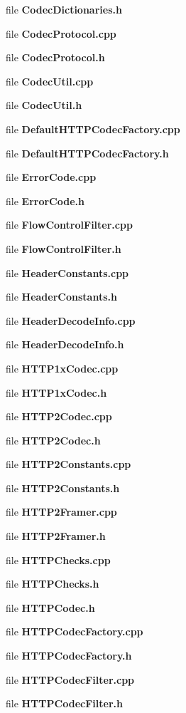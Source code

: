 \begin{DoxyCompactItemize}
\item 
file {\bf Codec\+Dictionaries.\+h}
\item 
file {\bf Codec\+Protocol.\+cpp}
\item 
file {\bf Codec\+Protocol.\+h}
\item 
file {\bf Codec\+Util.\+cpp}
\item 
file {\bf Codec\+Util.\+h}
\item 
file {\bf Default\+H\+T\+T\+P\+Codec\+Factory.\+cpp}
\item 
file {\bf Default\+H\+T\+T\+P\+Codec\+Factory.\+h}
\item 
file {\bf Error\+Code.\+cpp}
\item 
file {\bf Error\+Code.\+h}
\item 
file {\bf Flow\+Control\+Filter.\+cpp}
\item 
file {\bf Flow\+Control\+Filter.\+h}
\item 
file {\bf Header\+Constants.\+cpp}
\item 
file {\bf Header\+Constants.\+h}
\item 
file {\bf Header\+Decode\+Info.\+cpp}
\item 
file {\bf Header\+Decode\+Info.\+h}
\item 
file {\bf H\+T\+T\+P1x\+Codec.\+cpp}
\item 
file {\bf H\+T\+T\+P1x\+Codec.\+h}
\item 
file {\bf H\+T\+T\+P2\+Codec.\+cpp}
\item 
file {\bf H\+T\+T\+P2\+Codec.\+h}
\item 
file {\bf H\+T\+T\+P2\+Constants.\+cpp}
\item 
file {\bf H\+T\+T\+P2\+Constants.\+h}
\item 
file {\bf H\+T\+T\+P2\+Framer.\+cpp}
\item 
file {\bf H\+T\+T\+P2\+Framer.\+h}
\item 
file {\bf H\+T\+T\+P\+Checks.\+cpp}
\item 
file {\bf H\+T\+T\+P\+Checks.\+h}
\item 
file {\bf H\+T\+T\+P\+Codec.\+h}
\item 
file {\bf H\+T\+T\+P\+Codec\+Factory.\+cpp}
\item 
file {\bf H\+T\+T\+P\+Codec\+Factory.\+h}
\item 
file {\bf H\+T\+T\+P\+Codec\+Filter.\+cpp}
\item 
file {\bf H\+T\+T\+P\+Codec\+Filter.\+h}
\item 

\end{DoxyCompactItemize}

